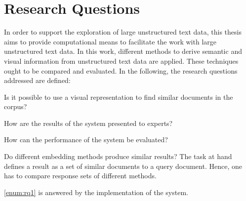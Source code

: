 \section{Research Questions}\label{sec:research-questions}

In order to support the exploration of large unstructured text data, 
this thesis aims to provide computational means to facilitate the work with large unstructured text data.
In this work, different methods to derive semantic and visual information from unstructured text data are applied.
These techniques ought to be compared and evaluated.
In the following, the research questions addressed are defined:
\begin{questions}%
    \item Is it possible to use a visual representation to find similar documents in the corpus?\label{enum:rq1}
    
    \item How are the results of the system presented to experts?\label{enum:rq2}
    
    \item How can the performance of the system be evaluated?\label{enum:rq3}

    \item Do different embedding methods produce similar results?\label{enum:rq4}
    The task at hand defines a result as a set of similar documents to a query document.
    Hence, one has to compare response sets of different methods.
\end{questions}


\ref{enum:rq1} is answered by the implementation of the system.